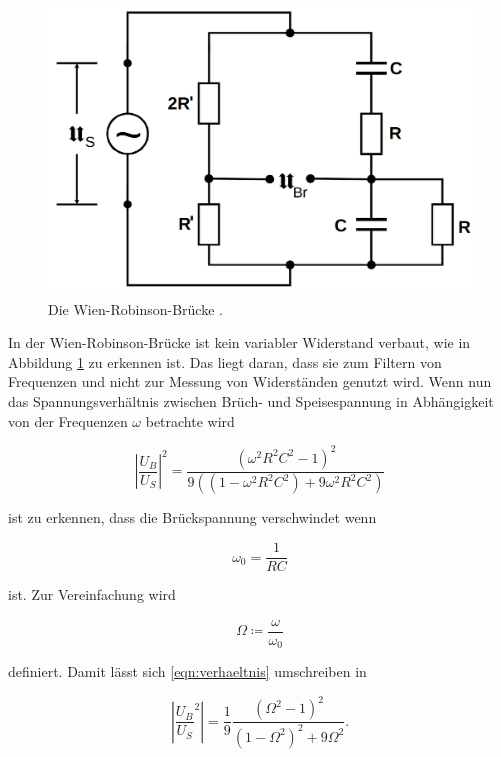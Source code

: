 \begin{figure}
    \centering
    \includegraphics[scale=0.25]{content/Wien-Robinson-Bruecke.png}
    \caption{Die Wien-Robinson-Brücke \cite[S. 223]{anleitung}.}
    \label{fig:wien}
\end{figure}

In der Wien-Robinson-Brücke ist kein variabler Widerstand verbaut, wie in Abbildung \ref{fig:wien}
zu erkennen ist.
Das liegt daran, dass sie zum Filtern von Frequenzen und nicht zur Messung von Widerständen genutzt wird.
Wenn nun das Spannungsverhältnis zwischen Brüch- und Speisespannung in Abhängigkeit von der Frequenzen $\omega$ betrachte wird 

\begin{equation}
    \left | \frac{U_B}{U_S} \right |^2 = \frac{(\omega^2R^2C^2-1)^2}{9((1-\omega^2R^2C^2) + 9 \omega^2 R^2 C^2)}
    \label{eqn:verhaeltnis}
\end{equation}

ist zu erkennen, dass die Brückspannung verschwindet wenn 

\begin{equation}
    \omega_0 = \frac{1}{RC}
    \label{eqn:wien_rc}
\end{equation}

ist. Zur Vereinfachung wird 

\begin{equation*}
    \Omega \coloneq \frac{\omega}{\omega_0}
\end{equation*}

definiert. Damit lässt sich \eqref{eqn:verhaeltnis} umschreiben in

\begin{equation}
    \left | \frac{U_B}{U_S}^2 \right | = \frac{1}{9} \frac{(\Omega^2 -1)^2}{(1-\Omega^2)^2 + 9\Omega^2}.
    \label{eqn:wien_verh}
\end{equation}

